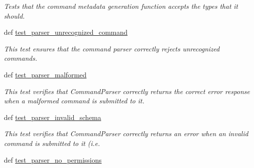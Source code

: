 \begin{DoxyCompactItemize}
\begin{DoxyCompactList}\small\item\em Tests that the command metadata generation function accepts the types that it should. \end{DoxyCompactList}\item 
def \hyperlink{classhwm_1_1command_1_1tests_1_1test__command__infrastructure_1_1_test_command_infrastructure_a15d2cd6581090dacad69703e6a905fec}{test\-\_\-parser\-\_\-unrecognized\-\_\-command}
\begin{DoxyCompactList}\small\item\em This test ensures that the command parser correctly rejects unrecognized commands. \end{DoxyCompactList}\item 
\hypertarget{classhwm_1_1command_1_1tests_1_1test__command__infrastructure_1_1_test_command_infrastructure_a2d313a097817ad3f98ff18b085d6ec8d}{def \hyperlink{classhwm_1_1command_1_1tests_1_1test__command__infrastructure_1_1_test_command_infrastructure_a2d313a097817ad3f98ff18b085d6ec8d}{test\-\_\-parser\-\_\-malformed}}\label{classhwm_1_1command_1_1tests_1_1test__command__infrastructure_1_1_test_command_infrastructure_a2d313a097817ad3f98ff18b085d6ec8d}

\begin{DoxyCompactList}\small\item\em This test verifies that Command\-Parser correctly returns the correct error response when a malformed command is submitted to it. \end{DoxyCompactList}\item 
def \hyperlink{classhwm_1_1command_1_1tests_1_1test__command__infrastructure_1_1_test_command_infrastructure_a7e870c9578b22da2ff69f1e3924adeee}{test\-\_\-parser\-\_\-invalid\-\_\-schema}
\begin{DoxyCompactList}\small\item\em This test verifies that Command\-Parser correctly returns an error when an invalid command is submitted to it (i.\-e. \end{DoxyCompactList}\item 
\hypertarget{classhwm_1_1command_1_1tests_1_1test__command__infrastructure_1_1_test_command_infrastructure_abbdda853c0a15c9091562019984295aa}{def \hyperlink{classhwm_1_1command_1_1tests_1_1test__command__infrastructure_1_1_test_command_infrastructure_abbdda853c0a15c9091562019984295aa}{test\-\_\-parser\-\_\-no\-\_\-permissions}}\label{classhwm_1_1command_1_1tests_1_1test__command__infrastructure_1_1_test_command_infrastructure_abbdda853c0a15c9091562019984295aa}


\end{DoxyCompactItemize}
